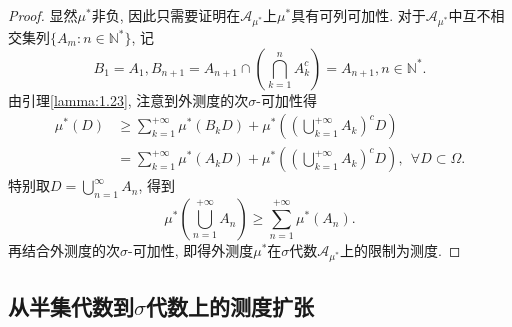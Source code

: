 \begin{proof}
	显然$\mu^*$非负, 因此只需要证明在$\mathscr{A}_{\mu^*}$上$\mu^*$具有可列可加性. 
	对于$\mathscr{A}_{\mu^*}$中互不相交集列$\{A_m:n\in\mathbb{N}^*\}$, 记
	\begin{equation}
		B_1 = A_1, B_{n+1} = A_{n+1}\cap\left( \bigcap_{k=1}^n A_k^c \right) = A_{n+1}, n\in\mathbb{N}^*.
	\end{equation}
	由引理\ref{lamma:1.23}, 注意到外测度的次$\sigma$-可加性得
	\begin{align}
		\mu^*(D)&\geqslant \sum_{k=1}^{+\infty}\mu^*(B_kD)+\mu^*\left( 
		\left( \bigcup_{k=1}^{+\infty}A_k \right)^c D	
		\right)\nonumber\\
		&= \sum_{k=1}^{+\infty}\mu^*(A_kD)+\mu^*\left( 
			\left( \bigcup_{k=1}^{+\infty}A_k \right)^c D	
			\right),~~\forall D\subset\Omega.
	\end{align}
	特别取$D = \bigcup_{n=1}^{\infty}A_n$, 得到
	\begin{equation}
		\mu^*\left( \bigcup_{n=1}^{+\infty}A_n \right)\geqslant \sum_{n=1}^{+\infty}\mu^*(A_n).
	\end{equation}
	再结合外测度的次$\sigma$-可加性, 即得外测度$\mu^*$在$\sigma$代数$\mathscr{A}_{\mu^*}$上的限制为测度.
\end{proof}

\subsection{从半集代数到$\sigma$代数上的测度扩张}

